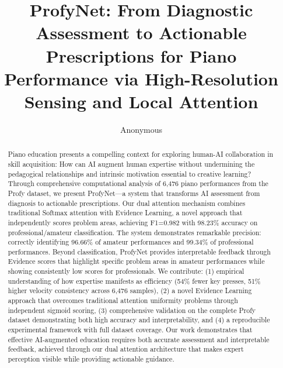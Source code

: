 \documentclass[sigconf,review,anonymous]{acmart}
\begin{document}
\title{ProfyNet: From Diagnostic Assessment to Actionable Prescriptions for Piano Performance via High-Resolution Sensing and Local Attention}

\author{Anonymous}


\renewcommand{\shortauthors}{Anonymous Authors}

\begin{abstract}
Piano education presents a compelling context for exploring human-AI collaboration in skill acquisition: How can AI augment human expertise without undermining the pedagogical relationships and intrinsic motivation essential to creative learning? Through comprehensive computational analysis of 6,476 piano performances from the Profy dataset, we present ProfyNet—a system that transforms AI assessment from diagnosis to actionable prescriptions. Our dual attention mechanism combines traditional Softmax attention with Evidence Learning, a novel approach that independently scores problem areas, achieving F1=0.982 with 98.23\% accuracy on professional/amateur classification. The system demonstrates remarkable precision: correctly identifying 96.66\% of amateur performances and 99.34\% of professional performances. Beyond classification, ProfyNet provides interpretable feedback through Evidence scores that highlight specific problem areas in amateur performances while showing consistently low scores for professionals. We contribute: (1) empirical understanding of how expertise manifests as efficiency (54\% fewer key presses, 51\% higher velocity consistency across 6,476 samples), (2) a novel Evidence Learning approach that overcomes traditional attention uniformity problems through independent sigmoid scoring, (3) comprehensive validation on the complete Profy dataset demonstrating both high accuracy and interpretability, and (4) a reproducible experimental framework with full dataset coverage. Our work demonstrates that effective AI-augmented education requires both accurate assessment and interpretable feedback, achieved through our dual attention architecture that makes expert perception visible while providing actionable guidance.
\end{abstract}
\end{document}
